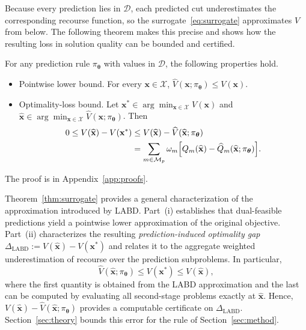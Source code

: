 Because every prediction lies in $\mathcal D$, each predicted cut underestimates the corresponding recourse function, so the surrogate~\eqref{eq:surrogate} approximates $V$ from below. The following theorem makes this precise and shows how the resulting loss in solution quality can be bounded and certified.

\begin{theorem}\label{thm:surrogate}
For any prediction rule $\pi_{\boldsymbol\theta}$ with values in $\mathcal D$, the following properties hold.
\begin{itemize}
\item[(i)] Pointwise lower bound. For every $\mathbf x\in\mathcal X$, $\widehat V(\mathbf x;\pi_{\boldsymbol\theta})\le V(\mathbf x)$.
\item[(ii)] Optimality-loss bound. Let $\mathbf x^*\in\arg\min_{\mathbf x\in\mathcal X}V(\mathbf x)$ and $\widehat{\mathbf x}\in\arg\min_{\mathbf x\in\mathcal X}\widehat V(\mathbf x;\pi_{\boldsymbol\theta})$. Then
\begin{equation}\label{eq:surrogate-gap}
\begin{aligned}
0\le V(\widehat{\mathbf x})-V(\mathbf x^*)
&\le V(\widehat{\mathbf x})-\widehat V(\widehat{\mathbf x};\pi_{\boldsymbol\theta})\\
&=\sum_{m\in\mathcal M_p}\omega_m\Bigl[Q_m(\widehat{\mathbf x})-\widehat Q_m(\widehat{\mathbf x};\pi_{\boldsymbol\theta})\Bigr].
\end{aligned}
\end{equation}
\end{itemize}
\end{theorem}

The proof is in Appendix~\ref{app:proofs}.

Theorem~\ref{thm:surrogate} provides a general characterization of the approximation introduced by LABD. Part~(i) establishes that dual-feasible predictions yield a pointwise lower approximation of the original objective. Part~(ii) characterizes the resulting \emph{prediction-induced optimality gap} $\Delta_{\mathrm{LABD}}:=V(\widehat{\mathbf x})-V(\mathbf x^*)$ and relates it to the aggregate weighted underestimation of recourse over the prediction subproblems. In particular,
\begin{equation}\label{eq:sandwich}
\widehat V(\widehat{\mathbf x};\pi_{\boldsymbol\theta})\le V(\mathbf x^*)\le V(\widehat{\mathbf x}),
\end{equation}
where the first quantity is obtained from the LABD approximation and the last can be computed by evaluating all second-stage problems exactly at $\widehat{\mathbf x}$. Hence, $V(\widehat{\mathbf x})-\widehat V(\widehat{\mathbf x};\pi_{\boldsymbol\theta})$ provides a computable certificate on $\Delta_{\mathrm{LABD}}$. Section~\ref{sec:theory} bounds this error for the rule of Section~\ref{sec:method}.

